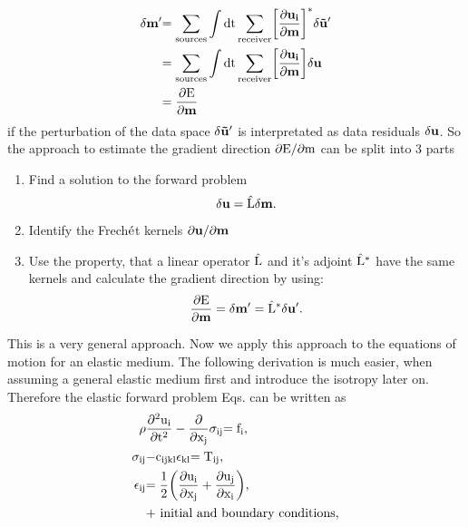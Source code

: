 \begin{equation}
\begin{split}
\rm{\delta \mathbf{m'}} &\rm{=  \sum_{sources} \int dt \sum_{receiver} \biggl[\frac{\partial \mathbf{u_i}}{\partial \mathbf{m}}\biggr]^*
\delta \mathbf{\tilde{u}}'} \\
                   &\rm{=  \sum_{sources} \int dt \sum_{receiver} \biggl[\frac{\partial \mathbf{u_i}}{\partial \mathbf{m}}\biggr] \delta \mathbf{u}} \\
                   &\rm{=  \frac{\partial E}{\partial \mathbf{m}}}
\end{split}
\label{dm_dE_dm}
\end{equation}
if the perturbation of the data space $\rm{\delta \mathbf{\tilde{u}}'}$ is interpretated as data residuals $\rm{\delta \mathbf{u}}$. So the approach to estimate the gradient direction $\rm{\partial E/\partial m}$ can be split into 3 parts
\begin{enumerate}
\item Find a solution to the forward problem
\begin{equation}
\rm{\delta \mathbf{u} = \hat{L} \delta \mathbf{m}.\notag}
\end{equation} 
\item Identify the Frech$\rm{\acute{e}}$t kernels $\rm{\partial \mathbf{u}/\partial \mathbf{m}}$ 
\item Use the property, that a linear operator $\rm{\hat{L}}$ and it's adjoint $\rm{\hat{L}^*}$ have the same kernels and calculate the gradient direction by using:
\begin{equation}
\rm{\frac{\partial E}{\partial \mathbf{m}} = \delta \mathbf{m'} = \hat{L}^* \delta \mathbf{u}'. \notag}
\end{equation} 
\end{enumerate}
This is a very general approach. Now we apply this approach to the equations of motion for an elastic medium. The following derivation is much easier, when assuming a general elastic medium first and introduce the isotropy later on. Therefore the elastic forward problem Eqs.  can be written as 
\begin{equation}
\begin{split}
\rm{\rho} & \rm{\frac{\partial^2 u_i}{\partial t^2} - \frac{\partial}{\partial x_j} \sigma_{ij}} \rm{=f_i,} \\
\rm{\sigma_{ij}} & \rm{- c_{ijkl} \epsilon_{kl}} \rm{= T_{ij},}\\
\rm{\epsilon_{ij}} &\rm{= \frac{1}{2} \biggl(\frac{\partial u_i}{\partial x_j}+\frac{\partial u_j}{\partial x_i}\biggr),}\\
&\rm{\text{+ initial and boundary conditions},}\\
\label{2:1}
\end{split}
\end{equation}
